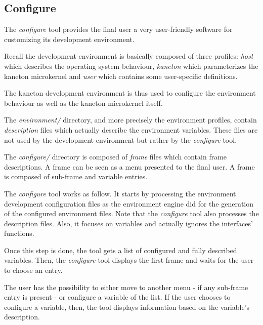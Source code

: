 %
%
%
%
%
%

%
%

\subsection{Configure}
\label{section:configure}

The \textit{configure} tool provides the final user a very user-friendly
software for customizing its development environment.

Recall the development environment is basically composed of three profiles:
\textit{host} which describes the operating system behaviour, \textit{kaneton}
which parameterizes the kaneton microkernel and \textit{user} which contains
some user-specific definitions.

The kaneton development environment is thus used to configure the environment
behaviour as well as the kaneton microkernel itself.

The \textit{environment/} directory, and more precisely the environment
profiles, contain \textit{description} files which actually describe the
environment variables. These files are not used by the development
environment but rather by the \textit{configure} tool.

The \textit{configure/} directory is composed of \textit{frame} files
which contain frame descriptions. A frame can be seen as a menu presented
to the final user. A frame is composed of sub-frame and variable entries.

The \textit{configure} tool works as follow. It starts by processing the
environment development configuration files as the environment engine did
for the generation of the configured environment files. Note that the
\textit{configure} tool also processes the description files. Also, it
focuses on variables and actually ignores the interfaces' functions.

Once this step is done, the tool gets a list of configured and fully described
variables. Then, the \textit{configure} tool displays the first frame and
waits for the user to choose an entry.

The user has the possibility to either move to another menu - if any sub-frame
entry is present - or configure a variable of the list. If the user chooses
to configure a variable, then, the tool displays information based on the
variable's description.

